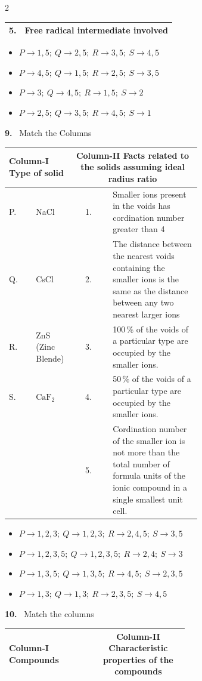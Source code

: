 \documentclass[10pt]{extarticle}
\newcommand{\qn}[1]{\par\smallskip\noindent\textbf{#1.}~}
\newenvironment{qoptions}{\begin{itemize}[leftmargin=1.8em,itemsep=1pt,topsep=2pt,label={}]}{\end{itemize}}
\newcommand{\opt}[2]{\item[(#1)] #2}
\begin{document}
\begin{multicols}{2}
\begin{center}
\begin{tabular}{|c|l|}
5. & Free radical intermediate involved\\\hline
\end{tabular}
\end{center}
\begin{qoptions}
\opt{A}{$P\to1,5;\ Q\to2,5;\ R\to3,5;\ S\to4,5$}
\opt{B}{$P\to4,5;\ Q\to1,5;\ R\to2,5;\ S\to3,5$}
\opt{C}{$P\to3;\ Q\to4,5;\ R\to1,5;\ S\to2$}
\opt{D}{$P\to2,5;\ Q\to3,5;\ R\to4,5;\ S\to1$}
\end{qoptions}
\qn{9} Match the Columns
\begin{center}\small
\begin{tabular}{|l|p{0.18\linewidth}|c|p{0.46\linewidth}|}\hline
\multicolumn{2}{|p{0.22\linewidth}|}{\centering\textbf{Column-I} Type of solid} & \multicolumn{2}{p{0.55\linewidth}|}{\centering\textbf{Column-II} Facts related to the solids assuming ideal radius ratio}\\\hline
P. & NaCl & 1. & Smaller ions present in the voids has cordination number greater than 4\\\hline
Q. & CsCl & 2. & The distance between the nearest voids containing the smaller ions is the same as the distance between any two nearest larger ions\\\hline
R. & ZnS (Zinc Blende) & 3. & 100\,\% of the voids of a particular type are occupied by the smaller ions.\\\hline
S. & $\mathrm{CaF_2}$ & 4. & 50\,\% of the voids of a particular type are occupied by the smaller ions.\\\hline
 & & 5. & Cordination number of the smaller ion is not more than the total number of formula units of the ionic compound in a single smallest unit cell.\\\hline
\end{tabular}
\end{center}
\begin{qoptions}
\opt{A}{$P\to1,2,3;\ Q\to1,2,3;\ R\to2,4,5;\ S\to3,5$}
\opt{B}{$P\to1,2,3,5;\ Q\to1,2,3,5;\ R\to2,4;\ S\to3$}
\opt{C}{$P\to1,3,5;\ Q\to1,3,5;\ R\to4,5;\ S\to2,3,5$}
\opt{D}{$P\to1,3;\ Q\to1,3;\ R\to2,3,5;\ S\to4,5$}
\end{qoptions}
\qn{10} Match the columns
\begin{center}\small
\begin{tabular}{|l|p{0.3\linewidth}|c|p{0.3\linewidth}|}\hline
\multicolumn{2}{|p{0.3\linewidth}|}{\centering\textbf{Column-I} Compounds} & \multicolumn{2}{p{0.4\linewidth}|}{\centering\textbf{Column-II} Characteristic properties of the compounds}\\\hline

\end{tabular}
\end{center}
\end{multicols}
\end{document}

